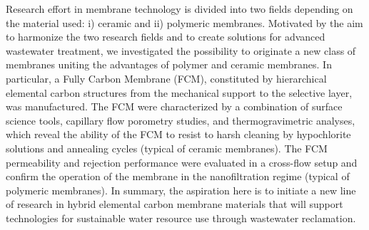 \justifying
Research effort in membrane technology is divided into two fields depending on the material used: i) ceramic and ii) polymeric membranes. Motivated by the aim to harmonize the two research fields and to create solutions for advanced wastewater treatment, we investigated the possibility to originate a new class of membranes uniting the advantages of polymer and ceramic membranes. In particular, a Fully Carbon Membrane (FCM), constituted by hierarchical elemental carbon structures from the mechanical support to the selective layer, was manufactured. The FCM were characterized by a combination of surface science tools, capillary flow porometry studies, and thermogravimetric analyses, which reveal the ability of the FCM to resist to harsh cleaning by hypochlorite solutions and annealing cycles (typical of ceramic membranes). The FCM permeability and rejection performance were evaluated in a cross-flow setup and confirm the operation of the membrane in the nanofiltration regime (typical of polymeric membranes). In summary, the aspiration here is to initiate a new line of research in hybrid elemental carbon membrane materials that will support technologies for sustainable water resource use through wastewater reclamation.
